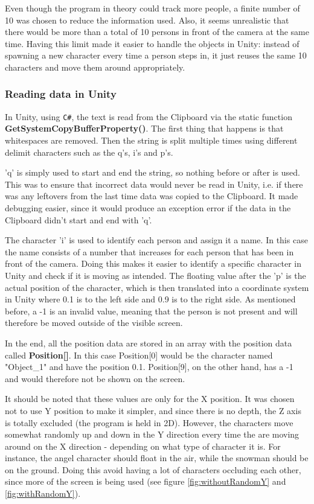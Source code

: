 Even though the program in theory could track more people, a finite number of 10 was chosen to reduce the information used. Also, it seems unrealistic that there would be more than a total of 10 persons in front of the camera at the same time. Having this limit made it easier to handle the objects in Unity: instead of spawning a new character every time a person steps in, it just reuses the same 10 characters and move them around appropriately.

\subsubsection{Reading data in Unity}
In Unity, using \texttt{C\#}, the text is read from the Clipboard via the static function \textbf{GetSystemCopyBufferProperty()}. The first thing that happens is that whitespaces are removed. Then the string is split multiple times using different delimit characters such as the q's, i's and p's.

'q' is simply used to start and end the string, so nothing before or after is used. This was to ensure that incorrect data would never be read in Unity, i.e. if there was any leftovers from the last time data was copied to the Clipboard. It made debugging easier, since it would produce an exception error if the data in the Clipboard didn't start and end with 'q'.

The character 'i' is used to identify each person and assign it a name. In this case the name consists of a number that increases for each person that has been in front of the camera. Doing this makes it easier to identify a specific character in Unity and check if it is moving as intended. The floating value after the 'p' is the actual position of the character, which is then translated into a coordinate system in Unity where 0.1 is to the left side and 0.9 is to the right side. As mentioned before, a -1 is an invalid value, meaning that the person is not present and will therefore be moved outside of the visible screen.

In the end, all the position data are stored in an array with the position data called \textbf{Position[]}. In this case Position[0] would be the character named "Object\_1" and have the position 0.1. Position[9], on the other hand, has a -1 and would therefore not be shown on the screen.

It should be noted that these values are only for the X position. It was chosen not to use Y position to make it simpler, and since there is no depth, the Z axis is totally excluded (the program is held in 2D). However, the characters move somewhat randomly up and down in the Y direction every time the are moving around on the X direction - depending on what type of character it is. For instance, the angel character should float in the air, while the snowman should be on the ground. Doing this avoid having a lot of characters occluding each other, since more of the screen is being used (see figure \ref{fig:withoutRandomY} and \ref{fig:withRandomY}).

